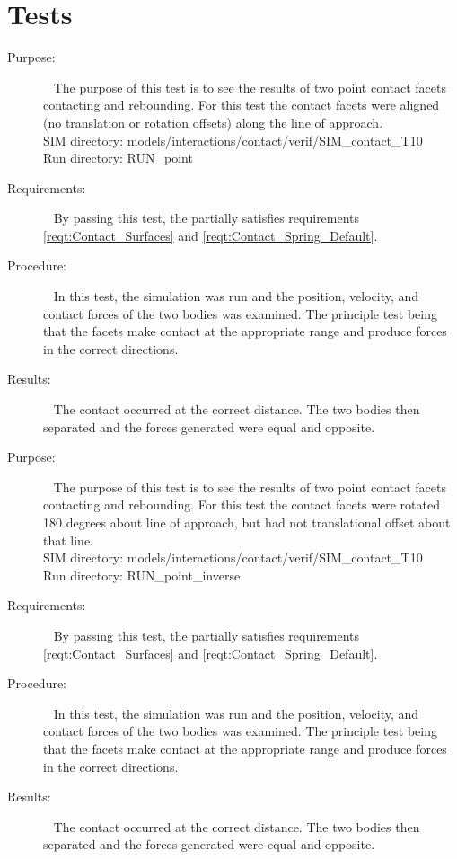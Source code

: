 \section{Tests}
\label{test:contact_01}
\begin{description}
\item[Purpose:] \ \newline
The purpose of this test is to see the results of two point contact facets contacting and rebounding. For this test the contact facets were aligned (no translation or rotation offsets) along the line of approach.\\
SIM directory: models/interactions/contact/verif/SIM\_contact\_T10\\
Run directory: RUN\_point
\item[Requirements:] \ \newline
By passing this test, the \ModelDesc partially satisfies requirements \ref{reqt:Contact_Surfaces} and \ref{reqt:Contact_Spring_Default}.
\item[Procedure:]\ \newline
In this test, the simulation was run and the position, velocity, and contact forces of the two bodies was examined. The principle test being that the facets make contact at the appropriate range and produce forces in the correct directions.
\item[Results:]\ \newline
The contact occurred at the correct distance.  The two bodies then separated and the forces generated were equal and opposite.
\end{description}

\label{test:contact_02}
\begin{description}
\item[Purpose:] \ \newline
The purpose of this test is to see the results of two point contact facets contacting and rebounding. For this test the contact facets were rotated 180 degrees about line of approach, but had not translational offset about that line.\\
SIM directory: models/interactions/contact/verif/SIM\_contact\_T10\\
Run directory: RUN\_point\_inverse
\item[Requirements:] \ \newline
By passing this test, the \ModelDesc partially satisfies requirements \ref{reqt:Contact_Surfaces} and \ref{reqt:Contact_Spring_Default}.
\item[Procedure:]\ \newline
In this test, the simulation was run and the position, velocity, and contact forces of the two bodies was examined. The principle test being that the facets make contact at the appropriate range and produce forces in the correct directions.
\item[Results:]\ \newline
The contact occurred at the correct distance.  The two bodies then separated and the forces generated were equal and opposite.
\end{description}

